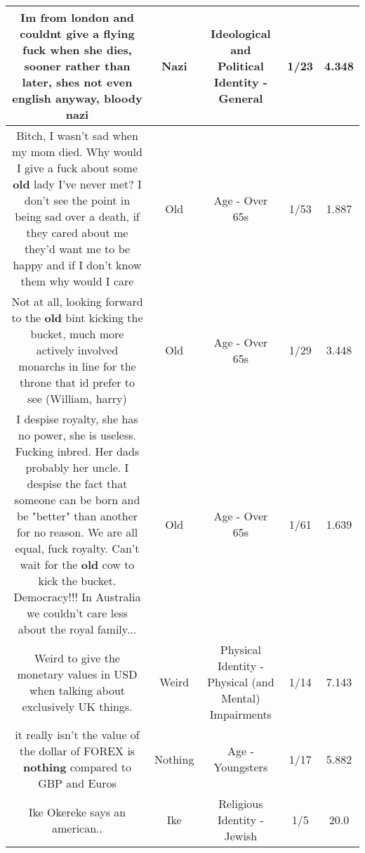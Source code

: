 \documentclass[11pt]{article}
\newlength\mylength
\begin{document}
\begin{center}
\begin{longtable}{|C{.65\mylength}|C{.30\mylength}|C{.12\mylength}|C{.12\mylength}|C{.12\mylength}|}
  \small Im from london and couldnt give a flying fuck when she dies, sooner rather than later, shes not even english anyway, bloody nazi\normalsize   & Nazi &  Ideological and Political Identity - General & 1/23 & 4.348 \\  \hline
  \small Bitch, I wasn't sad when my mom died. Why would I give a fuck about some \textbf{old} lady I've never met? I don't see the point in being sad over a death, if they cared about me they'd want me to be happy and if I don't know them why would I care\normalsize   & Old & Age - Over 65s & 1/53 & 1.887 \\  \hline
  \small Not at all, looking forward to the \textbf{old} bint kicking the bucket, much more actively involved monarchs in line for the throne that id prefer to see (William, harry)\normalsize   & Old & Age - Over 65s & 1/29 & 3.448 \\  \hline
  \small I despise royalty, she has no power, she is useless. Fucking inbred. Her dads probably her uncle. I despise the fact that someone can be born and be "better" than another for no reason. We are all equal, fuck royalty. Can't wait for the \textbf{old} cow to kick the bucket. Democracy!!! In Australia we couldn't care less about the royal family...\normalsize   & Old & Age - Over 65s & 1/61 & 1.639 \\  \hline
  \small Weird to give the monetary values in USD when talking about exclusively UK things.\normalsize   & Weird & Physical Identity - Physical (and Mental) Impairments & 1/14 & 7.143 \\  \hline
  \small it really isn't the value of the dollar of FOREX is \textbf{nothing} compared to GBP and  Euros\normalsize   & Nothing & Age - Youngsters & 1/17 & 5.882 \\  \hline
  \small Ike Okereke says an american..\normalsize   & Ike & Religious Identity - Jewish & 1/5 & 20.0 \\  \hline

\end{longtable}
\end{center}
\end{document}
